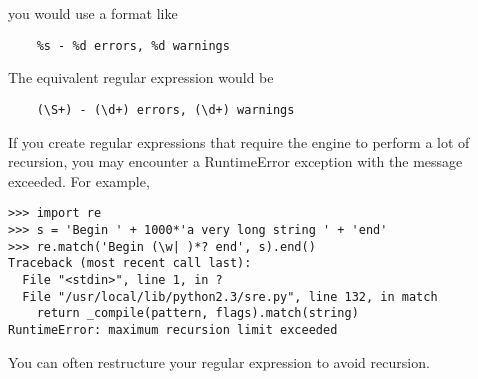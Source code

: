 you would use a  format like

\begin{verbatim}
    %s - %d errors, %d warnings
\end{verbatim}

The equivalent regular expression would be

\begin{verbatim}
    (\S+) - (\d+) errors, (\d+) warnings
\end{verbatim}


If you create regular expressions that require the engine to perform a
lot of recursion, you may encounter a RuntimeError exception with
the message  exceeded. For example,

\begin{verbatim}
>>> import re
>>> s = 'Begin ' + 1000*'a very long string ' + 'end'
>>> re.match('Begin (\w| )*? end', s).end()
Traceback (most recent call last):
  File "<stdin>", line 1, in ?
  File "/usr/local/lib/python2.3/sre.py", line 132, in match
    return _compile(pattern, flags).match(string)
RuntimeError: maximum recursion limit exceeded
\end{verbatim}

You can often restructure your regular expression to avoid recursion.

